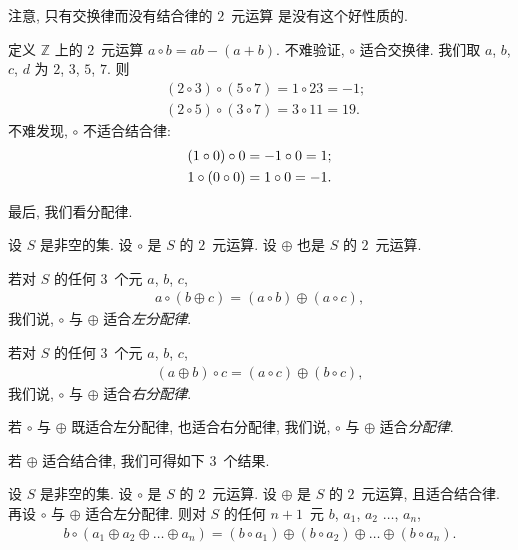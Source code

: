 \documentclass[../libro.tex]{subfiles}
\begin{document}
注意, 只有交换律而没有结合律的 \(2\)~元运算%
是没有这个好性质的.

\begin{example}
    定义 \(\mathbb{Z}\) 上的 \(2\)~元运算
    \(a \circ b = ab - (a + b)\).
    不难验证, \(\circ\) 适合交换律.
    我们取 \(a\), \(b\), \(c\), \(d\)
    为 \(2\), \(3\), \(5\), \(7\).
    则
    \begin{align*}
        & (2 \circ 3) \circ (5 \circ 7) = 1 \circ 23 = -1; \\
        & (2 \circ 5) \circ (3 \circ 7) = 3 \circ 11 = 19.
    \end{align*}
    不难发现, \(\circ\) 不适合结合律:
    \begin{align*}
        & (1 \circ 0) \circ 0 = -1 \circ 0 = 1; \\
        & 1 \circ (0 \circ 0) = 1 \circ 0 = -1.
        \qedhere
    \end{align*}
\end{example}

最后, 我们看分配律.

\begin{definition}
    设 \(S\) 是非空的集.
    设 \(\circ\) 是 \(S\) 的 \(2\)~元运算.
    设 \(\oplus\) 也是 \(S\) 的 \(2\)~元运算.

    若对 \(S\) 的任何 \(3\)~个元 \(a\), \(b\), \(c\),
    \begin{align*}
        a \circ (b \oplus c)
        = (a \circ b) \oplus (a \circ c),
    \end{align*}
    我们说, \(\circ\) 与 \(\oplus\) 适合\emph{左分配律}.

    若对 \(S\) 的任何 \(3\)~个元 \(a\), \(b\), \(c\),
    \begin{align*}
        (a \oplus b) \circ c
        = (a \circ c) \oplus (b \circ c),
    \end{align*}
    我们说, \(\circ\) 与 \(\oplus\) 适合\emph{右分配律}.

    若 \(\circ\) 与 \(\oplus\)
    既适合左分配律, 也适合右分配律,
    我们说,
    \(\circ\) 与 \(\oplus\) 适合\emph{分配律}.
\end{definition}

若 \(\oplus\) 适合结合律,
我们可得如下 \(3\)~个结果.

\begin{theorem}
    设 \(S\) 是非空的集.
    设 \(\circ\) 是 \(S\) 的 \(2\)~元运算.
    设 \(\oplus\) 是 \(S\) 的 \(2\)~元运算,
    且适合结合律.
    再设 \(\circ\) 与 \(\oplus\) 适合左分配律.
    则对 \(S\) 的任何 \(n + 1\)~元
    \(b\), \(a_1\), \(a_2\) \(\dots\), \(a_n\),
    \begin{align*}
        b \circ (a_1 \oplus a_2 \oplus \dots \oplus a_n)
        =
        (b \circ a_1) \oplus (b \circ a_2) \oplus
        \dots \oplus (b \circ a_n).
    \end{align*}
\end{theorem}
\end{document}

